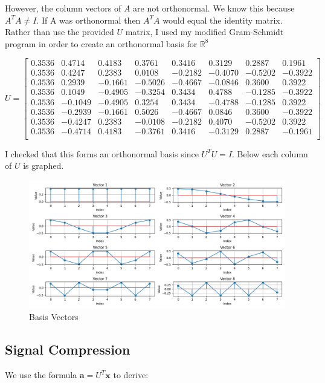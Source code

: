 \documentclass{article}
\newcommand{\bs}[1]{\boldsymbol{#1}}
\begin{document}
However, the column vectors of $A$ are not orthonormal. We know this because $A^TA \neq I$. If A was orthonormal then $A^TA$ would equal the identity matrix. Rather than use the provided $U$ matrix, I used my modified Gram-Schmidt program in order to create an orthonormal basis for $\mathbb{R}^8$

$$ U = \begin{bmatrix}
	 0.3536 & 0.4714 & 0.4183 & 0.3761 & 0.3416 & 0.3129 & 0.2887 & 0.1961 \\
	0.3536 & 0.4247 & 0.2383 & 0.0108 & -0.2182 & -0.4070 & -0.5202 & -0.3922 \\
	0.3536 & 0.2939 & -0.1661 & -0.5026 & -0.4667 & -0.0846 & 0.3600 & 0.3922 \\
	0.3536 & 0.1049 & -0.4905 & -0.3254 & 0.3434 & 0.4788 & -0.1285 & -0.3922 \\
	0.3536 & -0.1049 & -0.4905 & 0.3254 & 0.3434 & -0.4788 & -0.1285 & 0.3922 \\
	0.3536 & -0.2939 & -0.1661 & 0.5026 & -0.4667 & 0.0846 & 0.3600 & -0.3922 \\
	0.3536 & -0.4247 & 0.2383 & -0.0108 & -0.2182 & 0.4070 & -0.5202 & 0.3922 \\
	0.3536 & -0.4714 & 0.4183 & -0.3761 & 0.3416 & -0.3129 & 0.2887 & -0.1961 \\
	\end{bmatrix} $$
	
I checked that this forms an orthonormal basis since $U^TU=I$. Below each column of $U$ is graphed. 

\begin{figure}[h!]
	\centering
	\includegraphics[scale=0.5]{CA_01Figure_3.png}
	\caption{Basis Vectors}
	\label{fig: FIG 03}
\end{figure}

\subsection{Signal Compression}
We use the formula $\bs{a}=U^T\bs{x}$ to derive:
\end{document}
